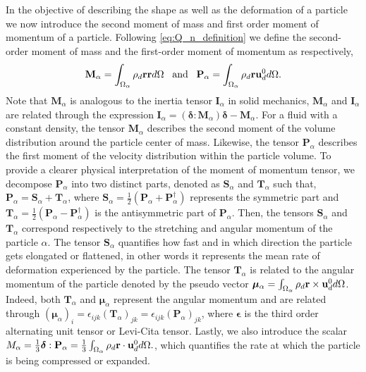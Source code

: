 In the objective of describing the shape as well as the deformation of a particle we now introduce the second moment of mass and first order moment of momentum of a particle. 
Following \ref{eq:Q_n_definition} we define the second-order moment of mass and the first-order moment of momentum as respectively,
\begin{equation}
    \textbf{M}_\alpha 
    = \int_{\Omega_{\alpha}}  \rho_d \textbf{r} \textbf{r}  d\Omega
    \;\;\;\text{and}\;\;\;
    \textbf{P}_\alpha 
    = \int_{\Omega_{\alpha}}  \rho_d \textbf{r} \textbf{u}_d^0  d\Omega.
    \label{eq:first_moment_of_momentum_def}
\end{equation}
Note that $\textbf{M}_\alpha$ is analogous to the inertia tensor $\textbf{I}_\alpha$ in solid mechanics, $\textbf{M}_\alpha$ and $\textbf{I}_\alpha$ are related through the expression $\textbf{I}_\alpha = (\bm\delta : \textbf{M}_\alpha)\bm\delta - \textbf{M}_\alpha$.
For a fluid with a constant density, the tensor $\textbf{M}_\alpha$ describes the second moment of the volume distribution around the particle center of mass.
Likewise, the tensor $\textbf{P}_\alpha$ describes the first moment of the velocity distribution within the particle volume. 
To provide a clearer physical interpretation of the moment of momentum tensor, we decompose $\textbf{P}_\alpha$ into two distinct parts, denoted as $\textbf{S}_\alpha$ and $\textbf{T}_\alpha$ such that,
$\textbf{P}_\alpha = \textbf{S}_\alpha+\textbf{T}_\alpha$, where $\textbf{S}_\alpha = \frac{1}{2}(\textbf{P}_\alpha + \textbf{P}_\alpha^\dagger)$ represents the symmetric part and $\textbf{T}_\alpha = \frac{1}{2}(\textbf{P}_\alpha - \textbf{P}_\alpha^\dagger)$ is the antisymmetric part of $\textbf{P}_\alpha$.
Then, the tensors $\textbf{S}_\alpha$ and $\textbf{T}_\alpha$ correspond respectively to the stretching and angular momentum of the particle $\alpha$. 
The tensor $\textbf{S}_\alpha$ quantifies how fast and in which direction the particle gets elongated or flattened, in other words it represents the mean rate of deformation experienced by the particle.
The tensor $\textbf{T}_\alpha$ is related to the angular momentum of the particle denoted by the pseudo vector $\bm\mu_\alpha = \int_{\Omega_{\alpha}}  \rho_d \textbf{r} \times \textbf{u}_d^0  d\Omega$. 
Indeed, both  $\textbf{T}_\alpha$ and $\bm{\mu}_\alpha$ represent the angular momentum and are related through $(\bm{\mu}_\alpha)_i = \epsilon_{ijk} (\textbf{T}_\alpha)_{jk} = \epsilon_{ijk} (\textbf{P}_\alpha)_{jk}$, where $\bm\epsilon$ is the third order alternating unit tensor or Levi-Cita tensor. 
Lastly, we also introduce the scalar $M_\alpha =\frac{1}{3}\bm\delta : \textbf{P}_\alpha = \frac{1}{3}\int_{\Omega_{\alpha}}  \rho_d \textbf{r} \cdot \textbf{u}_d^0  d\Omega.$, which quantifies the rate at which the particle is being compressed or expanded.
